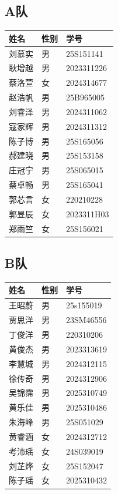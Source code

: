 \documentclass{ctexart}
\begin{document}
\subsection*{A队}
\renewcommand{\arraystretch}{1.2}
\begin{tabularx}{\textwidth}{@{} L{3cm} M{2cm} X @{}}
    \toprule
    \textbf{姓名} & \textbf{性别} & \textbf{学号} \\
    \midrule
    刘慕实 & 男 & 25S151141 \\
    耿增越 & 男 & 2023311226 \\
    蔡洛萱 & 女 & 2024314677 \\
    赵浩帆 & 男 & 25B965005 \\
    刘睿泽 & 男 & 2024311062 \\
    寇家辉 & 男 & 2024311312 \\
    陈子博 & 男 & 25S165056 \\
    郝建晓 & 男 & 25S153158 \\
    庄冠宁 & 男 & 25S065015 \\
    蔡卓畅 & 男 & 25S165041 \\
    郭芯言 & 女 & 220210228 \\
    郭昱辰 & 女 & 2023311H03 \\
    郑雨竺 & 女 & 25S156021 \\
    \bottomrule
\end{tabularx}

\subsection*{B队}
\renewcommand{\arraystretch}{1.2}
\begin{tabularx}{\textwidth}{@{} L{3cm} M{2cm} X @{}}
    \toprule
    \textbf{姓名} & \textbf{性别} & \textbf{学号} \\
    \midrule
    王昭蔚 & 男 & 25s155019 \\
    贾思洋 & 男 & 23SM46556 \\
    丁俊洋 & 男 & 220310206 \\
    黄俊杰 & 男 & 2023313619 \\
    李慧城 & 男 & 2024312115 \\
    徐传奇 & 男 & 2024312906 \\
    吴锦霈 & 男 & 2025310749 \\
    黄乐佳 & 男 & 2025310486 \\
    朱海峰 & 男 & 25S051029 \\
    黄睿涵 & 女 & 2024312712 \\
    考沛瑶 & 女 & 24S039019 \\
    刘芷烨 & 女 & 25S152047 \\
    陈子瑶 & 女 & 2025310432 \\
    \bottomrule
\end{tabularx}
\end{document}
